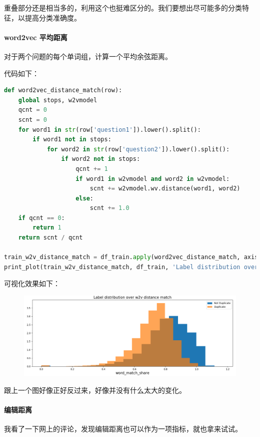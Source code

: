 \documentclass{article}
\begin{document}
重叠部分还是相当多的，利用这个也挺难区分的。我们要想出尽可能多的分类特征，以提高分类准确度。

\paragraph{word2vec 平均距离}

对于两个问题的每个单词组，计算一个平均余弦距离。

代码如下：

\begin{lstlisting}[language=python]
def word2vec_distance_match(row):
    global stops, w2vmodel
    qcnt = 0
    scnt = 0
    for word1 in str(row['question1']).lower().split():
        if word1 not in stops:
            for word2 in str(row['question2']).lower().split():
                if word2 not in stops:
                    qcnt += 1
                    if word1 in w2vmodel and word2 in w2vmodel:
                        scnt += w2vmodel.wv.distance(word1, word2)
                    else:
                        scnt += 1.0
    if qcnt == 0:
        return 1
    return scnt / qcnt

train_w2v_distance_match = df_train.apply(word2vec_distance_match, axis=1, raw=True)
print_plot(train_w2v_distance_match, df_train, 'Label distribution over w2v distance match', '4.png')
\end{lstlisting}

可视化效果如下：

\newpage

\begin{figure}[!h]
\centering
\includegraphics[scale=0.5]{4.png}
\end{figure}

跟上一个图好像正好反过来，好像并没有什么太大的变化。

\paragraph{编辑距离}

我看了一下网上的评论，发现编辑距离也可以作为一项指标，就也拿来试试。
\end{document}
